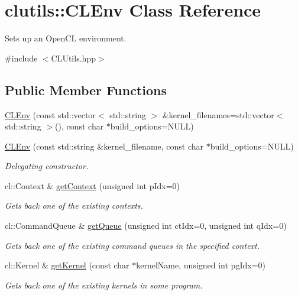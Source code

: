 \hypertarget{classclutils_1_1CLEnv}{}\section{clutils\+:\+:C\+L\+Env Class Reference}
\label{classclutils_1_1CLEnv}


Sets up an Open\+C\+L environment.  




{\ttfamily \#include $<$C\+L\+Utils.\+hpp$>$}

\subsection*{Public Member Functions}
\begin{DoxyCompactItemize}
\item 
\hyperlink{classclutils_1_1CLEnv_a8d2e3ea8b8d76fdc42960471a7c63ae7}{C\+L\+Env} (const std\+::vector$<$ std\+::string $>$ \&kernel\+\_\+filenames=std\+::vector$<$ std\+::string $>$(), const char $\ast$build\+\_\+options=N\+U\+L\+L)
\item 
\hyperlink{classclutils_1_1CLEnv_aac298f957d30dc881ef7f4931047c9a0}{C\+L\+Env} (const std\+::string \&kernel\+\_\+filename, const char $\ast$build\+\_\+options=N\+U\+L\+L)
\begin{DoxyCompactList}\small\item\em Delegating constructor. \end{DoxyCompactList}\item 
cl\+::\+Context \& \hyperlink{classclutils_1_1CLEnv_a939a2a5213fb9f7554ff789e83693577}{get\+Context} (unsigned int p\+Idx=0)
\begin{DoxyCompactList}\small\item\em Gets back one of the existing contexts. \end{DoxyCompactList}\item 
cl\+::\+Command\+Queue \& \hyperlink{classclutils_1_1CLEnv_a250da9d0e00e63294845b940c7fee376}{get\+Queue} (unsigned int ct\+Idx=0, unsigned int q\+Idx=0)
\begin{DoxyCompactList}\small\item\em Gets back one of the existing command queues in the specified context. \end{DoxyCompactList}\item 
cl\+::\+Kernel \& \hyperlink{classclutils_1_1CLEnv_a3d8ed78d2a977da3e3468de81efe198d}{get\+Kernel} (const char $\ast$kernel\+Name, unsigned int pg\+Idx=0)
\begin{DoxyCompactList}\small\item\em Gets back one of the existing kernels in some program. \end{DoxyCompactList}\item 

\end{DoxyCompactItemize}
